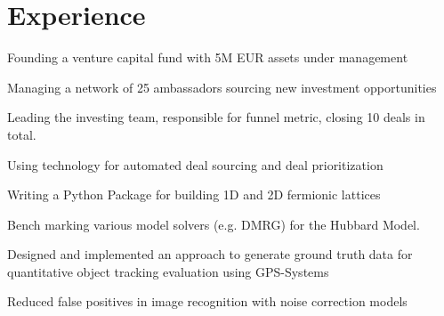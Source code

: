 \documentclass[]{deedy-resume-openfont}
\begin{document}
\begin{minipage}[t]{0.66\textwidth} 


\section{Experience}
\vspace{\topsep} %
\begin{tightemize}
\item Founding a venture capital fund with 5M EUR assets under management
\item Managing a network of 25 ambassadors sourcing new investment opportunities
\item Leading the investing team, responsible for funnel metric, closing 10 deals in total.
\item Using technology for automated deal sourcing and deal prioritization
\end{tightemize}
\sectionsep

\begin{tightemize}
\item Writing a Python Package for building 1D and 2D fermionic lattices
\item Bench marking various model solvers (e.g. DMRG) for the Hubbard Model.
\end{tightemize}
\sectionsep


\begin{tightemize}
\item Designed and implemented an approach to generate ground truth data for quantitative object tracking evaluation using GPS-Systems
\item Reduced false positives in image recognition with noise correction models
\end{tightemize}
\sectionsep


\end{minipage}
\end{document}
